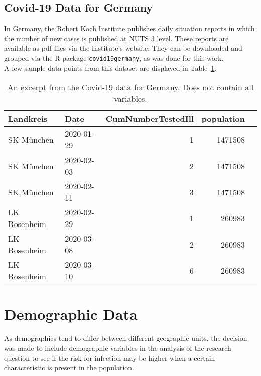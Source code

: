 \subsection*{Covid-19 Data for Germany}
In Germany, the Robert Koch Institute publishes daily situation reports in which the number of new cases is published at NUTS 3 level. These reports are available as pdf files via the Institute's website. They can be downloaded and grouped via the R package \texttt{covid19germany}\cite{covid19germany}, as was done for this work.\\
A few sample data points from this dataset are displayed in Table~\ref{datasetGermany}.\\
\begin{table}[H] 
\caption{An excerpt from the Covid-19 data for Germany. Does not contain all variables.\label{datasetGermany}}
\begin{tabular}{l l r r r}
\toprule
\textbf{Landkreis}	& \textbf{Date}	& \textbf{CumNumberTestedIll} & \textbf{population}\\
\midrule
SK München & 2020-01-29 & 1 & 1471508\\
SK München & 2020-02-03 & 2 & 1471508\\
SK München & 2020-02-11 & 3 & 1471508\\
LK Rosenheim & 2020-02-29 & 1 & 260983\\
LK Rosenheim & 2020-03-08 & 2 & 260983 \\
LK Rosenheim & 2020-03-10 & 6 & 260983 \\
\bottomrule
\end{tabular}
\end{table}
\section{Demographic Data}
As demographics tend to differ between different geographic units, the decision was made to include demographic variables in the analysis of the research question to see if the risk for infection may be higher when a certain characteristic is present in the population.
